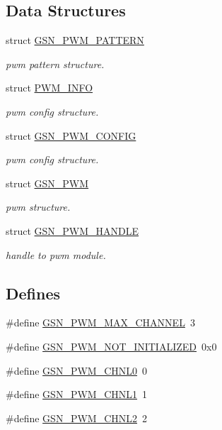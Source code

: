 \subsection*{Data Structures}
\begin{DoxyCompactItemize}
\item 
struct \hyperlink{a00183}{GSN\_\-PWM\_\-PATTERN}
\begin{DoxyCompactList}\small\item\em pwm pattern structure. \end{DoxyCompactList}\item 
struct \hyperlink{a00454}{PWM\_\-INFO}
\begin{DoxyCompactList}\small\item\em pwm config structure. \end{DoxyCompactList}\item 
struct \hyperlink{a00181}{GSN\_\-PWM\_\-CONFIG}
\begin{DoxyCompactList}\small\item\em pwm config structure. \end{DoxyCompactList}\item 
struct \hyperlink{a00180}{GSN\_\-PWM}
\begin{DoxyCompactList}\small\item\em pwm structure. \end{DoxyCompactList}\item 
struct \hyperlink{a00182}{GSN\_\-PWM\_\-HANDLE}
\begin{DoxyCompactList}\small\item\em handle to pwm module. \end{DoxyCompactList}\end{DoxyCompactItemize}
\subsection*{Defines}
\begin{DoxyCompactItemize}
\item 
\#define \hyperlink{a00540_ac1d538c0ad6a4ce7763e402480772401}{GSN\_\-PWM\_\-MAX\_\-CHANNEL}~3
\item 
\#define \hyperlink{a00540_ad5f01d5e224e1e2f9999c0367906aca2}{GSN\_\-PWM\_\-NOT\_\-INITIALIZED}~0x0
\item 
\#define \hyperlink{a00540_a0205531029f293297fd611e1833e2639}{GSN\_\-PWM\_\-CHNL0}~0
\item 
\#define \hyperlink{a00540_a3a03545733cc892b722dc8344e6ecdcc}{GSN\_\-PWM\_\-CHNL1}~1
\item 
\#define \hyperlink{a00540_a6d9d2d70da4c41d70df246b2e6532348}{GSN\_\-PWM\_\-CHNL2}~2
\end{DoxyCompactItemize}
